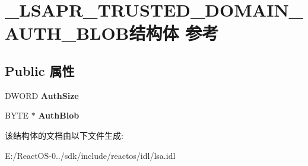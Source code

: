 \hypertarget{struct___l_s_a_p_r___t_r_u_s_t_e_d___d_o_m_a_i_n___a_u_t_h___b_l_o_b}{}\section{\+\_\+\+L\+S\+A\+P\+R\+\_\+\+T\+R\+U\+S\+T\+E\+D\+\_\+\+D\+O\+M\+A\+I\+N\+\_\+\+A\+U\+T\+H\+\_\+\+B\+L\+O\+B结构体 参考}
\label{struct___l_s_a_p_r___t_r_u_s_t_e_d___d_o_m_a_i_n___a_u_t_h___b_l_o_b}
\subsection*{Public 属性}
\begin{DoxyCompactItemize}
\item 
\mbox{\label{struct___l_s_a_p_r___t_r_u_s_t_e_d___d_o_m_a_i_n___a_u_t_h___b_l_o_b_a1a2cc8c56f486d6c7712de935200d46d}} 
D\+W\+O\+RD {\bfseries Auth\+Size}
\item 
\mbox{\label{struct___l_s_a_p_r___t_r_u_s_t_e_d___d_o_m_a_i_n___a_u_t_h___b_l_o_b_a06ad897b0f3cbebf93c12394b6c636f6}} 
B\+Y\+TE $\ast$ {\bfseries Auth\+Blob}
\end{DoxyCompactItemize}


该结构体的文档由以下文件生成\+:\begin{DoxyCompactItemize}
\item 
E\+:/\+React\+O\+S-\/0../sdk/include/reactos/idl/lsa.\+idl\end{DoxyCompactItemize}
